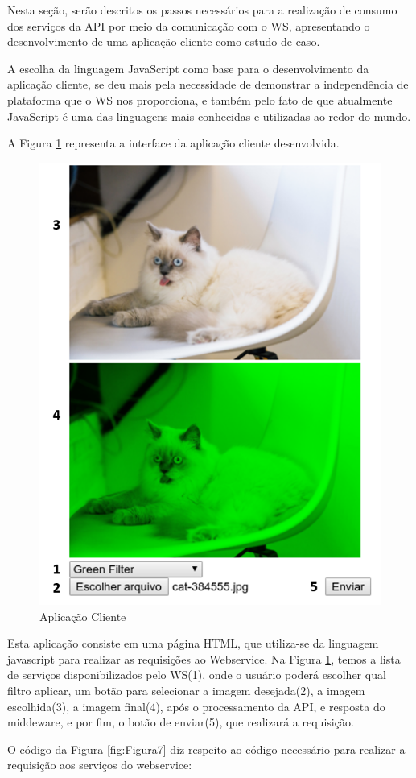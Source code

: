 \documentclass[12pt]{article}
\begin{document}
Nesta seção, serão descritos os passos necessários para a realização de consumo dos serviços da API por meio da comunicação com o WS, apresentando o desenvolvimento de uma aplicação cliente como estudo de caso.

A escolha da linguagem JavaScript como base para o desenvolvimento da aplicação cliente, se deu mais pela necessidade de demonstrar a independência de plataforma que o WS nos proporciona, e também pelo fato de que atualmente JavaScript é uma das linguagens mais conhecidas e utilizadas ao redor do mundo.

A Figura \ref{fig:Figura6} representa a interface da aplicação cliente desenvolvida.

\begin{figure}[ht]
	\centering
	\includegraphics[width=.5\textwidth]{aplicacao-cliente.png}
	\caption{Aplicação Cliente}
	\label{fig:Figura6}
\end{figure}

Esta aplicação consiste em uma página HTML, que utiliza-se da linguagem javascript para realizar as requisições ao Webservice. Na Figura \ref{fig:Figura6}, temos a lista de serviços disponibilizados pelo WS(1), onde o usuário poderá escolher qual filtro aplicar, um botão para selecionar a imagem desejada(2), a imagem escolhida(3), a imagem final(4), após o processamento da API, e resposta do middeware, e por fim, o botão de enviar(5), que realizará a requisição.

O código da Figura \ref{fig:Figura7} diz respeito ao código necessário para realizar a requisição aos serviços do webservice:
\end{document}
